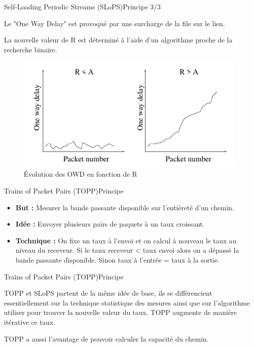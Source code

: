\documentclass[compress]{beamer}
\begin{document}
\begin{frame}{Self-Loading Periodic Streams (SLoPS)}{Principe 3/3}

Le "One Way Delay" est provoqué par une surcharge de la file
sur le lien.

La nouvelle valeur de R est déterminé à l'aide d'un algorithme
proche de la recherche binaire.

\begin{figure}[hbtp]
		\centering
		\includegraphics[scale=0.4]{slopsOWD.png}
		\caption{Évolution des OWD en fonction de R}
\end{figure}

\end{frame}
\begin{frame}{Trains of Packet Pairs (TOPP)}{Principe}
\begin{itemize}
\item \textbf{But :}  Mesurer la {\color{red}bande passante disponible} sur l'entièreté d'un chemin.
\item \textbf{Idée :}  Envoyer plusieurs pairs de paquets à un taux
croissant.
\item \textbf{Technique :} On fixe un taux à l'envoi et on calcul à
nouveau le taux au niveau du receveur. Si le taux receveur < taux envoi alors on a dépassé la bande passante disponible.
Sinon taux à l'entrée = taux à la sortie.
\end{itemize}
\end{frame}
\begin{frame}{Trains of Packet Pairs (TOPP)}{Principe}

TOPP et SLoPS partent de la même idée de base, ils se différencient
essentiellement sur la technique statistique des mesures ainsi que sur
l'algorithme utiliser pour trouver la nouvelle valeur du taux.
TOPP augmente de manière itérative ce taux.

TOPP a aussi l'avantage de pouvoir calculer la capacité du chemin.


\end{frame}
\end{document}
